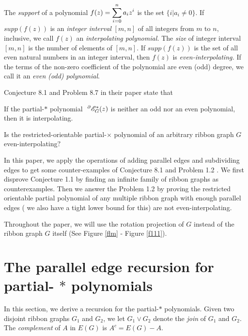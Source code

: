  The \textit{support} of a polynomial $f(z)=\displaystyle\sum_{i=0}^{n}a_iz^i$ is the set $\{i|a_i\neq 0\}$.  If $supp(f(z) )$ is an \textit{integer interval} $[m, n]$
of all  integers from $m$ to $n$, inclusive, we call $f(z)$  an \textit{interpolating polynomial. }The \textit{size} of integer interval $[m, n]$ is the number of elements of $[m, n].$
If $supp(f(z) )$ is the set of all even natural numbers in an integer interval, then $f(z)$ is  \textit{even-interpolating.} If the terms of the non-zero coefficient of the polynomial are even (odd) degree, we call it  an
 \textit{even (odd)  polynomial}.


  Conjecture 8.1 and Problem 8.7 in their paper \cite{GMT21a} state  that

\begin{conj}  If the partial-$*$ polynomial $ ~^{\partial}{{\mathscr{E}}}^{*}_{G}(z)$ is neither an odd nor an even polynomial, then it is interpolating.
\end{conj}

\begin{problem}  Is the restricted-orientable partial-$\times$ polynomial of an arbitrary ribbon graph $G$ even-interpolating$?$
\end{problem}

 In this paper, we apply the operations of adding {parallel edges}  and {subdividing  edges} to get some counter-examples of  Conjecture 8.1 and Problem 1.2 \cite{GMT21a}. We first disprove Conjecture 1.1 by finding an infinite family of ribbon graphs as counterexamples. Then
we answer the Problem 1.2 by proving the restricted orientable partial polynomial of any multiple ribbon graph with enough  parallel edges ( we also have a tight lower bound for this) are not even-interpolating.  %

\begin{rem} Throughout the paper, we will use the rotation projection \cite{GT87} of $G$ instead of the ribbon graph $G$ itself (See Figure \ref{flm} - Figure \ref{f111}).
\end{rem}
\section{The parallel edge recursion for partial- $*$
polynomials  }

In this section,  we  derive a recursion for the partial-$*$
polynomials.
 Given two disjoint ribbon graphs $G_{1}$ and $G_{2}$, we let $G_{1}\vee G_{2}$ denote
the \textit{join} of $G_{1}$ and $G_{2}$.    The \textit{complement} of $A$ in $E(G)$ is  $A^{c}=E(G)-A$.

